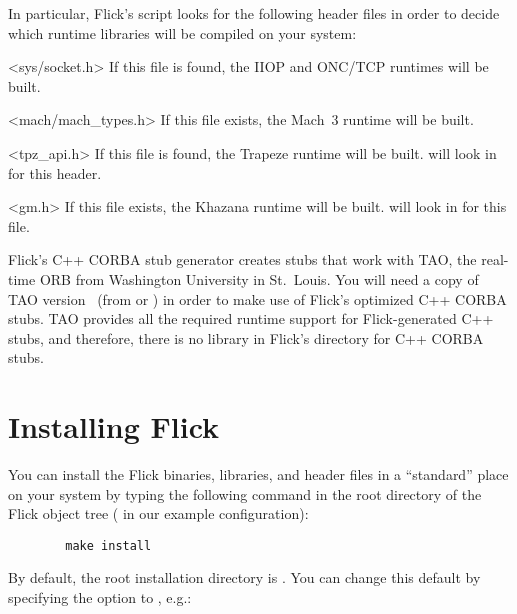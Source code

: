 In particular, Flick's  script looks for the following
header files in order to decide which runtime libraries will be compiled on
your system:

\begin{filenamelist}
  \item[<sys/socket.h>] If this file is found, the IIOP and ONC/TCP runtimes
  will be built.

  \item[<mach/mach_types.h>] If this file exists, the Mach~3 runtime will be
  built.

  \item[<tpz_api.h>] If this file is found, the Trapeze runtime will be built.
   will look in  for this
  header.

  \item[<gm.h>] If this file exists, the Khazana runtime will be built.
   will look in  for this
  file.
\end{filenamelist}

Flick's C++ CORBA stub generator creates stubs that work with TAO, the
real-time ORB from Washington University in St.\ Louis.  You will need a copy
of TAO version~\taoversion{} (from \taourl{} or \taosrcurl{}) in order to make
use of Flick's optimized C++ CORBA stubs.  TAO provides all the required
runtime support for Flick-generated C++ stubs, and therefore, there is no
library in Flick's  directory for C++ CORBA stubs.



\section{Installing Flick}
\label{sec:Installing Flick}

You can install the Flick binaries, libraries, and header files in a
``standard'' place on your system by typing the following command in the root
directory of the Flick object tree ( in our example
configuration):

\begin{verbatim}
        make install
\end{verbatim}

\noindent By default, the root installation directory is .
You can change this default by specifying the  option to
, e.g.:

